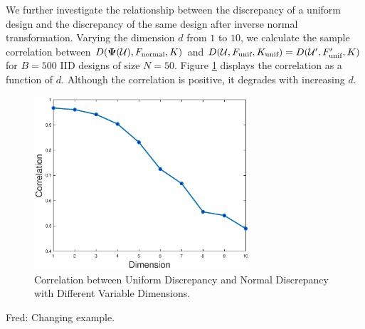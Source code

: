 \documentclass[graybox]{svmult}
\newcommand{\vPsi}{\boldsymbol{\Psi}}
\newcommand{\Udes}{\mathcal{U}}
\newcommand{\unif}{\textup{unif}}
\newcommand{\normal}{\textup{normal}}
\newcommand{\FJH}[1]{{\color{blue}Fred: #1}}
\begin{document}
We further investigate the relationship between the discrepancy of a uniform design and the  discrepancy of the same design after inverse normal transformation.
Varying the dimension $d$ from $1$ to $10$, we calculate the sample correlation between $D(\vPsi(\Udes),F_\normal, K)$ and $D(\Udes,F_\unif,K_\unif) = D(\Udes',F_\unif',K)$ for $B=500$ IID designs of size $N=50$.  Figure \ref{fig:DiscVsd} displays the correlation as a function of $d$. Although the correlation is positive, it degrades with increasing $d$.

\begin{figure}[ht]
\begin{center}
\includegraphics[width=8cm]{code/dimVsdisc.eps}
\caption{Correlation between Uniform Discrepancy and Normal Discrepancy with Different Variable Dimensions. \label{fig:DiscVsd}}
\end{center}
\end{figure}

\FJH{Changing example.}
\end{document}
